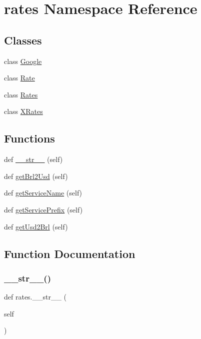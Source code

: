 \hypertarget{namespacerates}{}\section{rates Namespace Reference}
\label{namespacerates}
\subsection*{Classes}
\begin{DoxyCompactItemize}
\item 
class \hyperlink{classrates_1_1_google}{Google}
\item 
class \hyperlink{classrates_1_1_rate}{Rate}
\item 
class \hyperlink{classrates_1_1_rates}{Rates}
\item 
class \hyperlink{classrates_1_1_x_rates}{X\+Rates}
\end{DoxyCompactItemize}
\subsection*{Functions}
\begin{DoxyCompactItemize}
\item 
def \hyperlink{namespacerates_a2f1a70c33ee9e255938e4c19fd207264}{\+\_\+\+\_\+str\+\_\+\+\_\+} (self)
\item 
def \hyperlink{namespacerates_a083f2cdcd71554d301bcbfb0779ffa49}{get\+Brl2\+Usd} (self)
\item 
def \hyperlink{namespacerates_a5dd7b6601bc66e313c26984e32f1e290}{get\+Service\+Name} (self)
\item 
def \hyperlink{namespacerates_aafc179b32863137b88c74dd0ee2576bd}{get\+Service\+Prefix} (self)
\item 
def \hyperlink{namespacerates_ae4c7203ef8a919f9cf522581ca00b08a}{get\+Usd2\+Brl} (self)
\end{DoxyCompactItemize}


\subsection{Function Documentation}
\mbox{\label{namespacerates_a2f1a70c33ee9e255938e4c19fd207264}} 
\subsubsection{\texorpdfstring{\+\_\+\+\_\+str\+\_\+\+\_\+()}{\_\_str\_\_()}}
{\footnotesize\ttfamily def rates.\+\_\+\+\_\+str\+\_\+\+\_\+ (\begin{DoxyParamCaption}\item[{}]{self }\end{DoxyParamCaption})}



